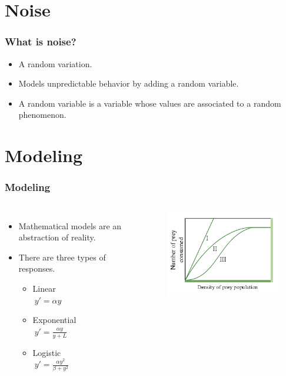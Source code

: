 \section{Noise}

\begin{frame}
  \frametitle{What is noise?}
  \begin{itemize}
  \item A random variation.
  \item Models unpredictable behavior by adding a random variable.
  \item A random variable is a variable whose values are associated to a random phenomenon.
  \end{itemize}
\end{frame}

\section{Modeling}

\begin{frame}
  \frametitle{Modeling}
  \begin{columns}
      \begin{itemize}
	\item Mathematical models are an abstraction of reality.
	\item There are three types of responses. 
	\begin{itemize}
		\item Linear\\
		$\ y'=\alpha y$
		\item Exponential\\
		$\ y' = \frac{\alpha y}{y+ L}$ 
		\item Logistic\\
		$\ y'= \frac {\alpha y^2}{\beta + y^2}$
	\end{itemize}
       \end{itemize}
      \begin {figure}
	\includegraphics[scale = 0.5, right]{FunctionalResponsesGraph}
       \end{figure}
  \end{columns}
\end{frame}

